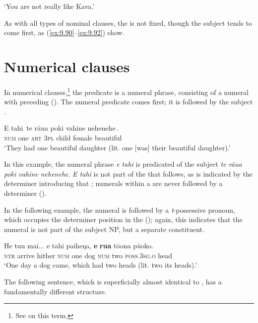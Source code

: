 \glt
‘You are not really like Kava.’ \textstyleExampleref{[R229.488]} 
\z

As with all types of nominal clauses, the  is not fixed, though the subject tends to come first, as (\ref{ex:9.90}–\ref{ex:9.92}) show.

\section{Numerical clauses}\label{sec:9.5}
In numerical clauses,\footnote{\label{fn:479}See \citet[108]{Clark1969} on this term.} the predicate is a numeral phrase, consisting of a numeral with preceding  (). The numeral predicate comes first; it is followed by the subject .

\ea\label{ex:9.93}
\gll {\ob}E tahi\,{\cb} {\ob}te rāua poki vahine nehenehe\,{\cb}. \\
{\db}\textsc{num} one {\db}\textsc{art} \textsc{3pl} child female beautiful \\

\glt
‘They had one beautiful daughter (lit. one [was] their beautiful daughter).’ \textstyleExampleref{[R338.001]} 
\z

In this example, the numeral phrase \textit{e tahi} is predicated of the subject \textit{te rāua poki vahine nehenehe}. \textit{E tahi} is not part of the  that follows, as is indicated by the determiner introducing that ; numerals within a  are never followed by a determiner (). 

In the following example, the numeral is followed by a \textit{t}{}-possessive pronoun, which occupies the determiner position in the  (); again, this indicates that the numeral is not part of the subject NP, but a separate constituent.

\ea\label{ex:9.94}
\gll He tu{\ꞌ}u mai... e tahi paiheŋa, \textbf{e} \textbf{rua} tō{\ꞌ}ona pū{\ꞌ}oko. \\
\textsc{ntr} arrive hither \textsc{num} one dog \textsc{num} two \textsc{poss.3sg.o} head \\

\glt 
‘One day a dog came, which had two heads (lit. two its heads).’ \textstyleExampleref{[R435.003]} 
\z

The following sentence, which is superficially almost identical to , has a fundamentally different structure.

